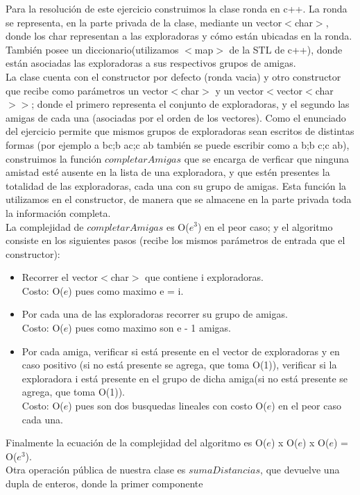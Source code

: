 Para la resolución de este ejercicio construimos la clase ronda en c++. La ronda se representa, en la parte privada de la clase,
mediante un vector$<$char$>$, donde los char representan a las exploradoras y cómo están ubicadas en la ronda. También posee un 
diccionario(utilizamos $<$map$>$ de la STL de c++), donde están asociadas las exploradoras a sus respectivos grupos de amigas. \\
La clase cuenta con el constructor por defecto (ronda vacia) y otro constructor que recibe como parámetros un vector$<$char$>$ y un
vector$<$vector$<$char$>>$; donde el primero representa el conjunto de exploradoras, y el segundo las amigas de cada una (asociadas
por el orden de los vectores). Como el enunciado del ejercicio permite que mismos grupos de exploradoras sean escritos de distintas 
formas (por ejemplo a bc;b ac;c ab también se puede escribir como a b;b c;c ab), construimos la función $completarAmigas$ que se 
encarga de verficar que ninguna amistad esté ausente en la lista de una exploradora, y que estén presentes la totalidad de las 
exploradoras, cada una con su grupo de amigas. Esta función la utilizamos en el constructor, de manera que se almacene en la parte 
privada toda la información completa. \\
La complejidad de $completarAmigas$ es O($e^3$) en el peor caso; y el algoritmo consiste en los siguientes pasos (recibe los mismos 
parámetros de entrada que el constructor): \\
\begin{itemize}
\item Recorrer el vector$<$char$>$ que contiene i exploradoras. \\
Costo: O($e$) pues como maximo  e = i. 
\item Por cada una de las exploradoras recorrer su grupo de amigas. \\
Costo: O($e$) pues como maximo son e - 1 amigas.
\item Por cada amiga, verificar si está presente en el vector de exploradoras y en caso positivo (si no está presente se agrega, que 
toma O(1)), verificar si la exploradora i está presente en el grupo de dicha amiga(si no está presente se agrega, que 
toma O(1)).  \\
Costo: O($e$) pues son dos busquedas lineales con costo O($e$) en el peor caso cada una.
\end{itemize}
Finalmente la ecuación de la complejidad del algoritmo es O($e$) x O($e$) x O($e$) = O($e^3$). \\
Otra operación pública de nuestra clase es $sumaDistancias$, que devuelve una dupla de enteros, donde la primer componente 
